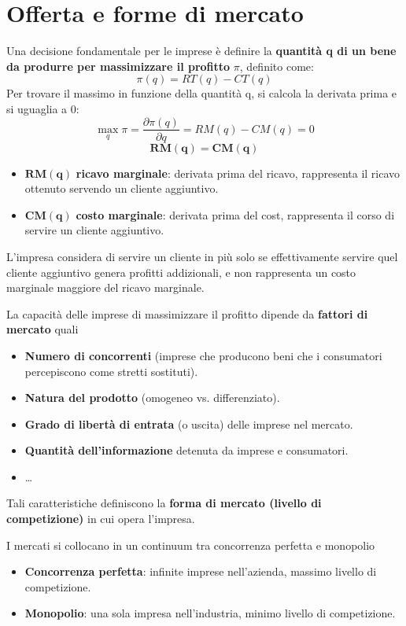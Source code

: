 \documentclass[../main.tex]{subfiles}
\begin{document}
\section{Offerta e forme di mercato}

Una decisione fondamentale per le imprese è definire la \textbf{quantità q di un bene da produrre per massimizzare il profitto} $\pi$, definito come:
$$\pi(q) = RT(q) - CT(q)$$
Per trovare il massimo in funzione della quantità q, si calcola la derivata prima e si uguaglia a 0:
$$\max_q \pi = \frac{\partial \pi(q)}{\partial q}=RM(q) - CM(q) = 0$$
$$\mathbf{RM(q) = CM(q)}$$
\begin{itemize}
    \item $\mathbf{RM(q)}$ \textbf{ricavo marginale}: derivata prima del ricavo, rappresenta il ricavo ottenuto servendo un cliente aggiuntivo.
    \item $\mathbf{CM(q)}$ \textbf{costo marginale}: derivata prima del cost, rappresenta il corso di servire un cliente aggiuntivo.
\end{itemize}

L'impresa considera di servire un cliente in più solo se effettivamente servire quel cliente aggiuntivo genera profitti addizionali, e non rappresenta un costo marginale maggiore del ricavo marginale.

La capacità delle imprese di massimizzare il profitto dipende da \textbf{fattori di mercato} quali
\begin{itemize}
    \item \textbf{Numero di concorrenti} (imprese che producono beni che i consumatori percepiscono come stretti sostituti).
    \item \textbf{Natura del prodotto} (omogeneo vs. differenziato).
    \item \textbf{Grado di libertà di entrata} (o uscita) delle imprese nel mercato.
    \item \textbf{Quantità dell'informazione} detenuta da imprese e consumatori.
    \item \dots
\end{itemize}

Tali caratteristiche definiscono la \textbf{forma di mercato (livello di competizione)} in cui opera l'impresa.

I mercati si collocano in un continuum tra concorrenza perfetta e monopolio
\begin{itemize}
    \item \textbf{Concorrenza perfetta}: infinite imprese nell'azienda, massimo livello di competizione.
    \item \textbf{Monopolio}: una sola impresa nell'industria, minimo livello di competizione.
\end{itemize}
\end{document}
